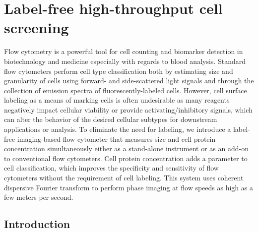 \chapter{Label-free high-throughput cell screening}

Flow cytometry is a powerful tool for cell counting and biomarker detection in biotechnology and medicine especially with regards to blood analysis. Standard flow cytometers perform cell type classification both by estimating size and granularity of cells using forward- and side-scattered light signals and through the collection of emission spectra of fluorescently-labeled cells. However, cell surface labeling as a means of marking cells is often undesirable as many reagents negatively impact cellular viability or provide activating/inhibitory signals, which can alter the behavior of the desired cellular subtypes for downstream applications or analysis. To eliminate the need for labeling, we introduce a label-free imaging-based flow cytometer that measures size and cell protein concentration simultaneously either as a stand-alone instrument or as an add-on to conventional flow cytometers. Cell protein concentration adds a parameter to cell classification, which improves the specificity and sensitivity of flow cytometers without the requirement of cell labeling. This system uses coherent dispersive Fourier transform to perform phase imaging at flow speeds as high as a few meters per second.

\section{Introduction}

